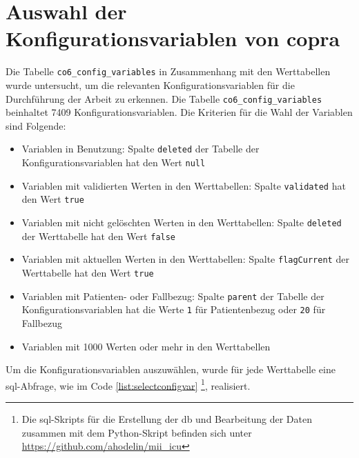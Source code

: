 \section{Auswahl der Konfigurationsvariablen von \acs{copra}} \label{sec:configvarcopra}

Die Tabelle \texttt{co6\_config\_variables} in Zusammenhang mit den Werttabellen wurde untersucht, um die relevanten Konfigurationsvariablen für die Durchführung der Arbeit zu erkennen. Die Tabelle \texttt{co6\_config\_variables} beinhaltet 7409 Konfigurationsvariablen.
Die Kriterien für die Wahl der Variablen sind Folgende:

\begin{itemize}
	\item Variablen in Benutzung: Spalte \texttt{deleted} der Tabelle der Konfigurationsvariablen hat den Wert \texttt{null}
	\item Variablen mit validierten Werten in den Werttabellen: Spalte \texttt{validated} hat den Wert \texttt{true}
	\item Variablen mit nicht gelöschten Werten in den Werttabellen: Spalte \texttt{deleted} der Werttabelle hat den Wert \texttt{false}
	\item Variablen mit aktuellen Werten in den Werttabellen: Spalte \texttt{flagCurrent} der Werttabelle hat den Wert \texttt{true}
	\item Variablen mit Patienten- oder Fallbezug: Spalte \texttt{parent} der Tabelle der Konfigurationsvariablen hat die Werte \texttt{1} für Patientenbezug oder \texttt{20} für Fallbezug
	\item Variablen mit 1000 Werten oder mehr in den Werttabellen
\end{itemize}

\newpage

Um die Konfigurationsvariablen auszuwählen, wurde für jede Werttabelle eine \ac{sql}-Abfrage, wie im Code \ref{list:selectconfigvar} \footnote{Die \ac{sql}-Skripts für die Erstellung der \ac{db} und Bearbeitung der Daten zusammen mit dem Python-Skript befinden sich unter \href{https://github.com/ahodelin/mii_icu}{https://github.com/ahodelin/mii\_icu}}, realisiert.

